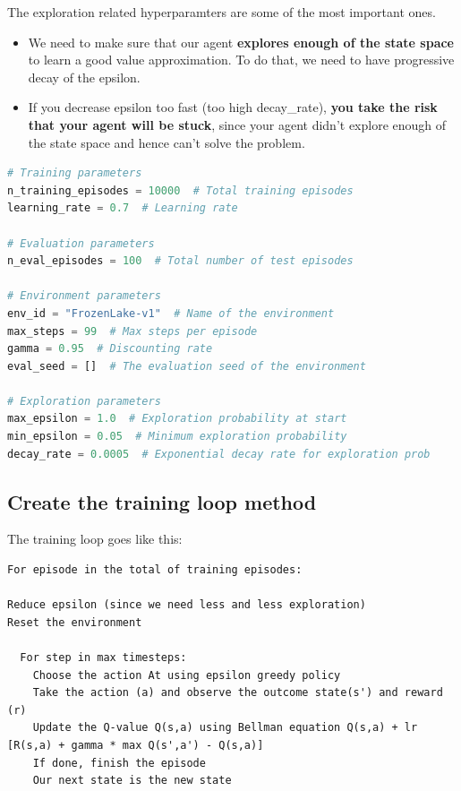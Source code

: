 \documentclass[11pt,a4paper]{article}
\begin{document}
The exploration related hyperparamters are some of the most important ones.

\begin{itemize}
\tightlist
\item
  We need to make sure that our agent \textbf{explores enough of the state space} to learn a good value approximation. To do that, we need to have progressive decay of the epsilon.
\item
  If you decrease epsilon too fast (too high decay\_rate), \textbf{you take the risk that your agent will be stuck}, since your agent didn't explore enough of the state space and hence can't solve the problem.
\end{itemize}

\begin{lstlisting}[language=Python]
# Training parameters
n_training_episodes = 10000  # Total training episodes
learning_rate = 0.7  # Learning rate

# Evaluation parameters
n_eval_episodes = 100  # Total number of test episodes

# Environment parameters
env_id = "FrozenLake-v1"  # Name of the environment
max_steps = 99  # Max steps per episode
gamma = 0.95  # Discounting rate
eval_seed = []  # The evaluation seed of the environment

# Exploration parameters
max_epsilon = 1.0  # Exploration probability at start
min_epsilon = 0.05  # Minimum exploration probability
decay_rate = 0.0005  # Exponential decay rate for exploration prob
\end{lstlisting}

\subsection{Create the training loop method}\label{create-the-training-loop-method}


The training loop goes like this:

\begin{lstlisting}
For episode in the total of training episodes:

Reduce epsilon (since we need less and less exploration)
Reset the environment

  For step in max timesteps:
    Choose the action At using epsilon greedy policy
    Take the action (a) and observe the outcome state(s') and reward (r)
    Update the Q-value Q(s,a) using Bellman equation Q(s,a) + lr [R(s,a) + gamma * max Q(s',a') - Q(s,a)]
    If done, finish the episode
    Our next state is the new state
\end{lstlisting}
\end{document}
